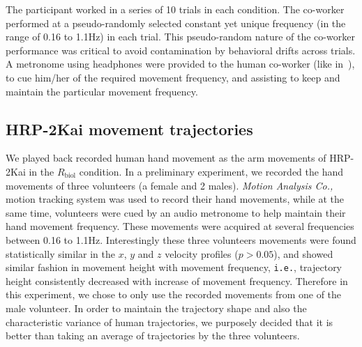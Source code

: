 The participant worked in a series of 10 trials in each condition. The co-worker performed at a pseudo-randomly selected constant yet unique frequency (in the range of 0.16 to 1.1Hz) in each trial. This pseudo-random nature of the co-worker performance was critical to avoid contamination by behavioral drifts across trials. A metronome using headphones were provided to the human co-worker (like in~\cite{Bisio:PlosOne:2014}), to cue him/her of the required movement frequency, and assisting to keep and maintain the particular movement frequency.

\subsection{HRP-2Kai movement trajectories} \label{hrpTraj}

We played back recorded human hand movement as the arm movements of HRP-2Kai in the $R_{\text{biol}}$ condition. In a preliminary experiment, we recorded the hand movements of three volunteers (a female and 2 males). {\it Motion Analysis Co.,} motion tracking system was used to record their hand movements, while at the same time, volunteers were cued by an audio metronome to help maintain their hand movement frequency. These movements were acquired at several frequencies between 0.16 to 1.1Hz. Interestingly these three volunteers movements were found statistically similar in the $x$, $y$ and $z$ velocity profiles ($p > 0.05$), and showed similar fashion in movement height with movement frequency, \texttt{i.e.}, trajectory height consistently decreased with increase of movement frequency. Therefore in this experiment, we chose to only use the recorded movements from one of the male volunteer. In order to maintain the trajectory shape and also the characteristic variance of human trajectories, we purposely decided that it is better than taking an average of trajectories by the three volunteers. 


